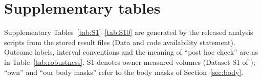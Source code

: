 \clearpage
\section{Supplementary tables}\label{app:supptab}

\setcounter{table}{0}
\renewcommand{\thetable}{S\arabic{table}}
\renewcommand{\theHtable}{S\arabic{table}}

Supplementary Tables~\ref{tab:S1}--\ref{tab:S10} are generated by the released analysis scripts from the stored
result files (Data and code availability statement). Outcome labels, interval conventions and the meaning of ``post hoc
check'' are as in Table~\ref{tab:robustness}. S1 denotes owner-measured volumes (Dataset S1 of \citealp{matte2025});
``own'' and ``our body masks'' refer to the body masks of Section~\ref{sec:body}.











